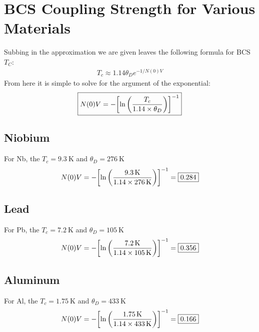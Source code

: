 \documentclass[12pt]{article}
\begin{document}
\section{BCS Coupling Strength for Various Materials}
Subbing in the approximation we are given leaves the following formula for BCS $T_C$:
\begin{align*}
  T_c\approx1.14\theta_De^{-1/N(0)V}
\end{align*}
From here it is simple to solve for the argument of the exponential:
\begin{align*}
  \boxed{N(0)V=-\qty[\ln\qty(\frac{T_c}{1.14\times\theta_D})]^{-1}}
\end{align*}
\subsection{Niobium}
For Nb, the $T_c=\SI{9.3}{\K}$ and $\theta_D=\SI{276}{\K}$
\begin{align*}
  N(0)V=-\qty[\ln\qty(\frac{\SI{9.3}{\K}}{1.14\times\SI{276}{\K}})]^{-1}
  =\boxed{0.284}
\end{align*}
\subsection{Lead}
For Pb, the $T_c=\SI{7.2}{\K}$ and $\theta_D=\SI{105}{\K}$
\begin{align*}
  N(0)V=-\qty[\ln\qty(\frac{\SI{7.2}{\K}}{1.14\times\SI{105}{\K}})]^{-1}
  =\boxed{0.356}
\end{align*}
\subsection{Aluminum}
For Al, the $T_c=\SI{1.75}{\K}$ and $\theta_D=\SI{433}{\K}$
\begin{align*}
  N(0)V=-\qty[\ln\qty(\frac{\SI{1.75}{\K}}{1.14\times\SI{433}{\K}})]^{-1}
  =\boxed{0.166}
\end{align*}
\end{document}
